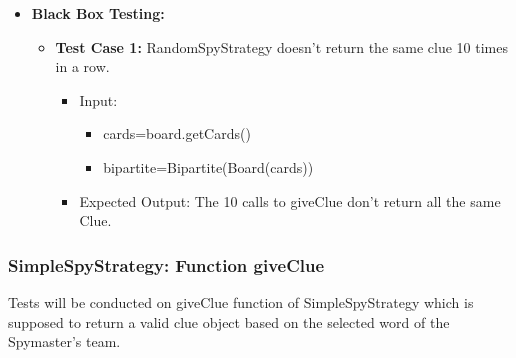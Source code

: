 \documentclass[12pt]{article}
\begin{document}
\begin{itemize}
    \item \textbf{Black Box Testing:}
    \begin{itemize}
        \item \textbf{Test Case 1:} RandomSpyStrategy doesn't return the same clue 10 times in a row.
            \begin{itemize}
            \item Input:
                \begin{itemize}
                    \item cards=board.getCards()
                    \item bipartite=Bipartite(Board(cards))
                \end{itemize}
            \item Expected Output: The 10 calls to giveClue don't return all the same Clue.
        \end{itemize}
    \end{itemize}
\end{itemize}


\subsubsection{SimpleSpyStrategy: Function giveClue}
Tests will be conducted on giveClue function of SimpleSpyStrategy which is supposed to return a valid clue object based on the selected word of the Spymaster's team. 
\end{document}
